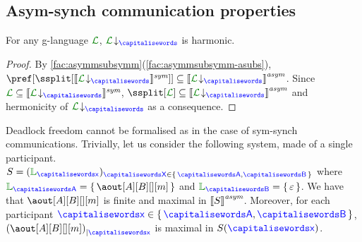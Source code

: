 
\subsection{Asym-synch communication properties}

\begin{definition}[Harmonicity]

\end{definition}

\begin{lemma}
For any g-language $\clang$, $\proj{\clang}{}$ is harmonic.
\end{lemma}
\begin{proof}
By \cref{fac:asymmsubsymm}(\ref{fac:asymmsubsymm-asubs}),
$\pref[{\ssplit[{\ssem{\proj{\clang}{}}}]}] \subseteq \asem{\proj{\clang}{}}$.
Since $\clang\subseteq \ssem{\proj{\clang}{}}$, 
$\ssplit[\clang]\subseteq \asem{\proj{\clang}{}}$ and hermonicity of $\proj{\clang}{}$ 
as a consequence.
\end{proof}

Deadlock freedom cannot be formalised as in the case of sym-synch communications.
Trivially, let us consider the following system, made of a single participant.
 $\aCS=  ({\alang}_{\px})_{\ptp[X] \in\Set{\p,\q}}$ where
$\alang_{\p}= \Set{\aout[A][B][][m]}$ and $\alang_{\q}= \Set{\emptyword}$.
We have that $\aout[A][B][][m]$ is finite and maximal in ${\llbracket S \rrbracket}^{\textit{asym}}$. Moreover,
for each participant $\px\in\Set{\p,\q}$, $\filter{(\aout[A][B][][m])}{\px}$ is maximal in
$\aCS(\px)$.

